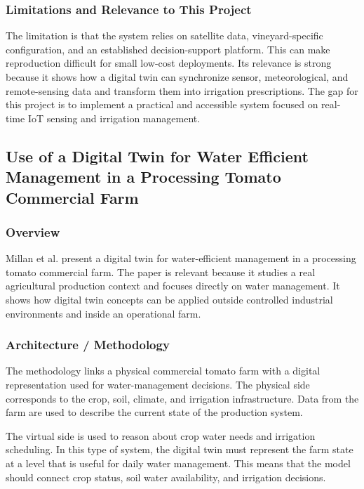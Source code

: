 \subsubsection{Limitations and Relevance to This Project}

The limitation is that the system relies on satellite data, vineyard-specific configuration, and an established decision-support platform. This can make reproduction difficult for small low-cost deployments. Its relevance is strong because it shows how a digital twin can synchronize sensor, meteorological, and remote-sensing data and transform them into irrigation prescriptions. The gap for this project is to implement a practical and accessible system focused on real-time IoT sensing and irrigation management.

\subsection[Use of a Digital Twin for Water Efficient Management in a Processing Tomato Commercial Farm]{Use of a Digital Twin for Water Efficient Management in a Processing Tomato Commercial Farm \cite{millan2025tomatodt}}

\subsubsection{Overview}

Millan et al. present a digital twin for water-efficient management in a processing tomato commercial farm. The paper is relevant because it studies a real agricultural production context and focuses directly on water management. It shows how digital twin concepts can be applied outside controlled industrial environments and inside an operational farm.

\subsubsection{Architecture / Methodology}

The methodology links a physical commercial tomato farm with a digital representation used for water-management decisions. The physical side corresponds to the crop, soil, climate, and irrigation infrastructure. Data from the farm are used to describe the current state of the production system.

The virtual side is used to reason about crop water needs and irrigation scheduling. In this type of system, the digital twin must represent the farm state at a level that is useful for daily water management. This means that the model should connect crop status, soil water availability, and irrigation decisions.

